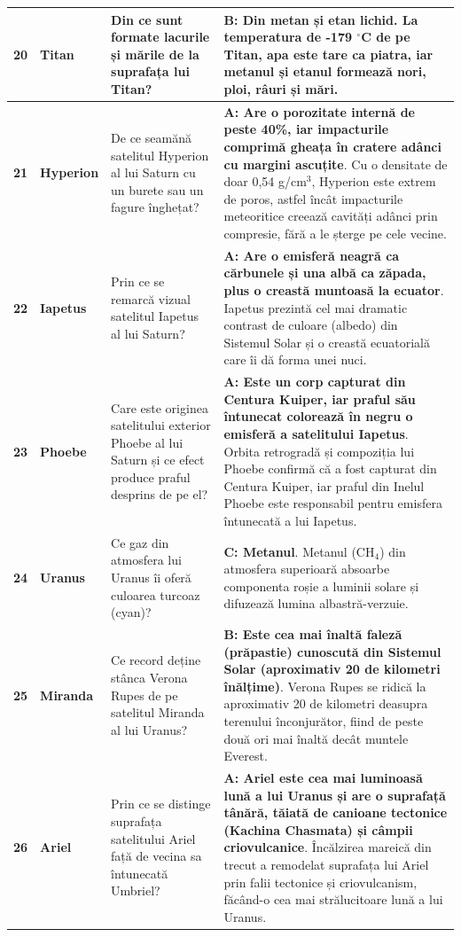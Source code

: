 \begin{longtable}{@{}r >{\raggedright\arraybackslash}p{2.7cm} >{\raggedright\arraybackslash}p{4.8cm} >{\raggedright\arraybackslash}p{6.5cm}@{}}
\textbf{20} & \textbf{Titan} & Din ce sunt formate lacurile și mările de la suprafața lui Titan? & \textbf{B: Din metan și etan lichid}. {\footnotesize La temperatura de -179 $^\circ$C de pe Titan, apa este tare ca piatra, iar metanul și etanul formează nori, ploi, râuri și mări.} \\ \midrule
\textbf{21} & \textbf{Hyperion} & De ce seamănă satelitul Hyperion al lui Saturn cu un burete sau un fagure înghețat? & \textbf{A: Are o porozitate internă de peste 40\%, iar impacturile comprimă gheața în cratere adânci cu margini ascuțite}. {\footnotesize Cu o densitate de doar 0,54 g/cm$^3$, Hyperion este extrem de poros, astfel încât impacturile meteoritice creează cavități adânci prin compresie, fără a le șterge pe cele vecine.} \\ \midrule
\textbf{22} & \textbf{Iapetus} & Prin ce se remarcă vizual satelitul Iapetus al lui Saturn? & \textbf{A: Are o emisferă neagră ca cărbunele și una albă ca zăpada, plus o creastă muntoasă la ecuator}. {\footnotesize Iapetus prezintă cel mai dramatic contrast de culoare (albedo) din Sistemul Solar și o creastă ecuatorială care îi dă forma unei nuci.} \\ \midrule
\textbf{23} & \textbf{Phoebe} & Care este originea satelitului exterior Phoebe al lui Saturn și ce efect produce praful desprins de pe el? & \textbf{A: Este un corp capturat din Centura Kuiper, iar praful său întunecat colorează în negru o emisferă a satelitului Iapetus}. {\footnotesize Orbita retrogradă și compoziția lui Phoebe confirmă că a fost capturat din Centura Kuiper, iar praful din Inelul Phoebe este responsabil pentru emisfera întunecată a lui Iapetus.} \\ \midrule
\textbf{24} & \textbf{Uranus} & Ce gaz din atmosfera lui Uranus îi oferă culoarea turcoaz (cyan)? & \textbf{C: Metanul}. {\footnotesize Metanul (CH$_4$) din atmosfera superioară absoarbe componenta roșie a luminii solare și difuzează lumina albastră-verzuie.} \\ \midrule
\textbf{25} & \textbf{Miranda} & Ce record deține stânca Verona Rupes de pe satelitul Miranda al lui Uranus? & \textbf{B: Este cea mai înaltă faleză (prăpastie) cunoscută din Sistemul Solar (aproximativ 20 de kilometri înălțime)}. {\footnotesize Verona Rupes se ridică la aproximativ 20 de kilometri deasupra terenului înconjurător, fiind de peste două ori mai înaltă decât muntele Everest.} \\ \midrule
\textbf{26} & \textbf{Ariel} & Prin ce se distinge suprafața satelitului Ariel față de vecina sa întunecată Umbriel? & \textbf{A: Ariel este cea mai luminoasă lună a lui Uranus și are o suprafață tânără, tăiată de canioane tectonice (Kachina Chasmata) și câmpii criovulcanice}. {\footnotesize Încălzirea mareică din trecut a remodelat suprafața lui Ariel prin falii tectonice și criovulcanism, făcând-o cea mai strălucitoare lună a lui Uranus.} \\ \midrule

\end{longtable}
